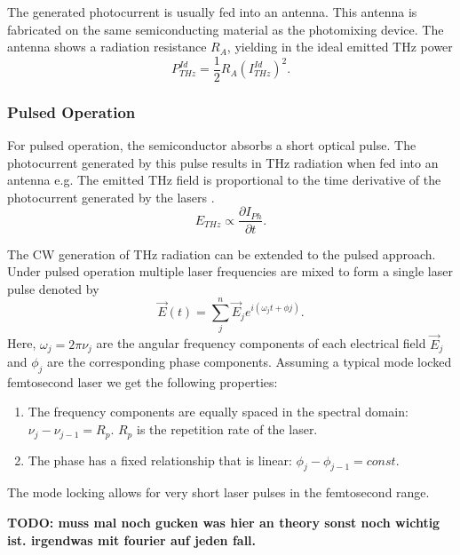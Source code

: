 The generated photocurrent is usually fed into an antenna. This antenna is fabricated on the same semiconducting material as the photomixing device. The antenna shows a radiation resistance $R_A$, yielding in the ideal emitted THz power 
\begin{equation}
	P_{THz}^{Id}=\frac{1}{2}R_A (I_{THz}^{Id})^2.
\end{equation}

\subsubsection{Pulsed Operation}

For pulsed operation, the semiconductor absorbs a short optical pulse. The photocurrent generated by this pulse results in THz radiation when fed into an antenna e.g. The emitted THz field is proportional to the time derivative of the photocurrent generated by the lasers \cite{preuTunableContinuouswaveTerahertz2011}.
\begin{equation}
	E_{THz} \propto \frac{\partial I_{Ph}}{\partial t}.
\end{equation}

The CW generation of THz radiation can be extended to the pulsed approach. Under pulsed operation multiple laser frequencies are mixed to form a single laser pulse denoted by 
\begin{equation}
	\vec{E}(t) = \sum_j^n \vec{E}_je^{i(\omega_j t + \phi j)}.
\end{equation}
Here, $\omega_j = 2 \pi \nu_j$ are the angular frequency components of each electrical field $\vec{E}_j$ and $\phi_j$ are the corresponding phase components. Assuming a typical mode locked femtosecond laser we get the following properties: 
\renewcommand{\labelenumi}{\alph{enumi})}
\begin{enumerate}
	\item The frequency components are equally spaced in the spectral domain: $\nu_j - \nu_{j-1} = R_p$. $R_p$ is the repetition rate of the laser.
	\item The phase has a fixed relationship that is linear: $\phi_j - \phi_{j-1} = const.$
\end{enumerate}

The mode locking allows for very short laser pulses in the femtosecond range.

\textbf{TODO: muss mal noch gucken was hier an theory sonst noch wichtig ist. irgendwas mit fourier auf jeden fall.}



